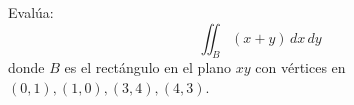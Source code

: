 Evalúa: 
\[\iint_B (x+y) \, dx \, dy\]
donde $B$ es el rectángulo en el plano $xy$ con vértices en $(0,1),(1,0),(3,4),(4,3)$.
